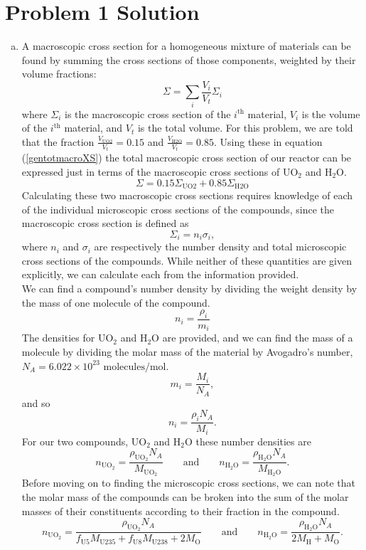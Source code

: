 \section*{Problem 1 Solution}

\begin{enumerate}[a)]

\item 

A macroscopic cross section for a homogeneous mixture of materials can be found by summing the cross sections of those components, weighted by their volume fractions: 
\begin{equation}
\label{gentotmacroXS}
\Sigma = \sum_{i} \frac{V_i}{V_t}\Sigma_i
\end{equation}
where $\Sigma_i$ is the macroscopic cross section of the $i^{\text{th}}$ material, $V_i$ is the volume of the $i^{\text{th}}$ material, and $V_t$ is the total volume. For this problem, we are told that the fraction $\frac{V_{\text{UO2}}}{V_t} = 0.15$ and $\frac{V_{\text{H2O}}}{V_t} = 0.85$. Using these in equation (\ref{gentotmacroXS}) the total macroscopic cross section of our reactor can be expressed just in terms of the macroscopic cross sections of UO$_2$ and H$_2$O.
\begin{equation}
\label{totmacroXS}
\Sigma = 0.15\Sigma_{\text{UO2}} + 0.85\Sigma_{\text{H2O}}
\end{equation}
Calculating these two macroscopic cross sections requires knowledge of each of the individual microscopic cross sections of the compounds, since the macroscopic cross section is defined as
\begin{equation}
\label{macroXSi}
\Sigma_i = n_i\sigma_i ,
\end{equation}
where $n_i$ and $\sigma_i$ are respectively the number density and total microscopic cross sections of the compounds. While neither of these quantities are given explicitly, we can calculate each from the information provided. 
\-\\

We can find a compound's number density by dividing the weight density by the mass of one molecule of the compound. 
$$ n_i = \frac{\rho_i}{m_i} $$
The densities for UO$_2$ and H$_2$O are provided, and we can find the mass of a molecule by dividing the molar mass of the material by Avogadro's number, $N_A = 6.022\times10^{23}\text{ molecules/mol}$.
$$ m_i = \frac{M_i}{N_A}, $$
and so
$$ n_i = \frac{\rho_i N_A}{M_i} .$$
For our two compounds, UO$_2$ and H$_2$O these number densities are
$$ n_{\text{UO}_2} = \frac{\rho_{\text{UO}_2} N_A}{M_{\text{UO}_2}} \qquad\text{and}\qquad n_{\text{H}_2\text{O}} = \frac{\rho_{\text{H}_2\text{O}} N_A}{M_{\text{H}_2\text{O}}} .$$
Before moving on to finding the microscopic cross sections, we can note that the molar mass of the compounds can be broken into the sum of the molar masses of their constituents according to their fraction in the compound.
$$ n_{\text{UO}_2} = \frac{\rho_{\text{UO}_2} N_A}{f_{\text{U}5}M_{\text{U235}} + f_{\text{U}8}M_{\text{U238}} + 2M_{\text{O}}} \qquad\text{and}\qquad n_{\text{H}_2\text{O}} = \frac{\rho_{\text{H}_2\text{O}} N_A}{2M_{\text{H}} + M_{\text{O}}} .$$
\-\\


\end{enumerate}
